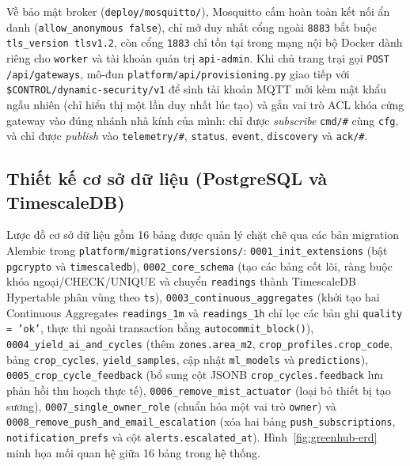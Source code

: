 Về bảo mật broker (\texttt{deploy/mosquitto/}), Mosquitto cấm hoàn toàn kết nối ẩn danh (\texttt{allow\_anonymous false}), chỉ mở duy nhất cổng ngoài \texttt{8883} bắt buộc \texttt{tls\_version tlsv1.2}, còn cổng \texttt{1883} chỉ tồn tại trong mạng nội bộ Docker dành riêng cho \texttt{worker} và tài khoản quản trị \texttt{api-admin}. Khi chủ trang trại gọi \texttt{POST /api/gateways}, mô-đun \texttt{platform/api/provisioning.py} giao tiếp với \texttt{\$CONTROL/dynamic-security/v1} để sinh tài khoản MQTT mới kèm mật khẩu ngẫu nhiên (chỉ hiển thị một lần duy nhất lúc tạo) và gắn vai trò ACL khóa cứng gateway vào đúng nhánh nhà kính của mình: chỉ được \textit{subscribe} \texttt{cmd/\#} cùng \texttt{cfg}, và chỉ được \textit{publish} vào \texttt{telemetry/\#}, \texttt{status}, \texttt{event}, \texttt{discovery} và \texttt{ack/\#}.

\subsection{Thiết kế cơ sở dữ liệu (PostgreSQL và TimescaleDB)}
\label{subsec:c3-database}

Lược đồ cơ sở dữ liệu gồm 16 bảng được quản lý chặt chẽ qua các bản migration Alembic trong \texttt{platform/migrations/versions/}: \texttt{0001\_init\_extensions} (bật \texttt{pgcrypto} và \texttt{timescaledb}), \texttt{0002\_core\_schema} (tạo các bảng cốt lõi, ràng buộc khóa ngoại/CHECK/UNIQUE và chuyển \texttt{readings} thành TimescaleDB Hypertable phân vùng theo \texttt{ts}), \texttt{0003\_continuous\_aggregates} (khởi tạo hai Continuous Aggregates \texttt{readings\_1m} và \texttt{readings\_1h} chỉ lọc các bản ghi \texttt{quality = 'ok'}, thực thi ngoài transaction bằng \texttt{autocommit\_block()}), \texttt{0004\_yield\_ai\_and\_cycles} (thêm \texttt{zones.area\_m2}, \texttt{crop\_profiles.crop\_code}, bảng \texttt{crop\_cycles}, \texttt{yield\_samples}, cập nhật \texttt{ml\_models} và \texttt{predictions}), \texttt{0005\_crop\_cycle\_feedback} (bổ sung cột JSONB \texttt{crop\_cycles.feedback} lưu phản hồi thu hoạch thực tế), \texttt{0006\_remove\_mist\_actuator} (loại bỏ thiết bị tạo sương), \texttt{0007\_single\_owner\_role} (chuẩn hóa một vai trò \texttt{owner}) và \texttt{0008\_remove\_push\_and\_email\_escalation} (xóa hai bảng \texttt{push\_subscriptions}, \texttt{notification\_prefs} và cột \texttt{alerts.escalated\_at}). Hình~\ref{fig:greenhub-erd} minh họa mối quan hệ giữa 16 bảng trong hệ thống.

